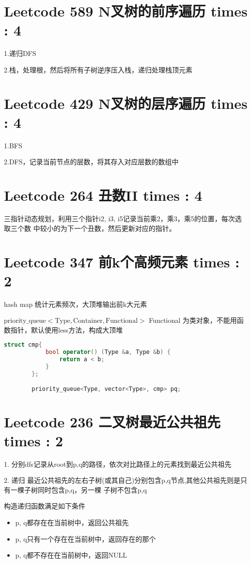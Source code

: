 \documentclass[UTF8]{ctexart}
\begin{document}
\section{Leetcode 589 N叉树的前序遍历 times : 4}
1.递归DFS

2.栈，处理根，然后将所有子树逆序压入栈，递归处理栈顶元素

\section{Leetcode 429 N叉树的层序遍历 times : 4}
1.BFS

2.DFS，记录当前节点的层数，将其存入对应层数的数组中

\section{Leetcode 264 丑数II times : 4}
三指针动态规划，利用三个指针i2, i3, i5记录当前乘2，乘3，乘5的位置，每次选取三个数
中较小的为下一个丑数，然后更新对应的指针。

\section{Leetcode 347 前k个高频元素 times : 2}
hash map 统计元素频次，大顶堆输出前k大元素

$\mathrm{priority\_queue<Type, Container, Functional>}$
Functional 为类对象，不能用函数指针，默认使用less方法，构成大顶堆
\begin{framed}
	\begin{lstlisting}[language=C++]
		struct cmp{
			bool operator() (Type &a, Type &b) {
				return a < b;
			}
		};

		priority_queue<Type, vector<Type>, cmp> pq;
	\end{lstlisting}
\end{framed}

\section{Leetcode 236 二叉树最近公共祖先 times : 2}
1. 分别dfs记录从root到p,q的路径，依次对比路径上的元素找到最近公共祖先

2. 递归
最近公共祖先的左右子树(或其自己)分别包含p,q节点,其他公共祖先则是只有一棵子树同时包含p,q，另一棵
子树不包含p,q

构造递归函数满足如下条件
\begin{itemize}
	\item p, q都存在在当前树中，返回公共祖先
	\item p, q只有一个存在在当前树中，返回存在的那个
	\item p, q都不存在在当前树中，返回NULL
\end{itemize}
\end{document}
